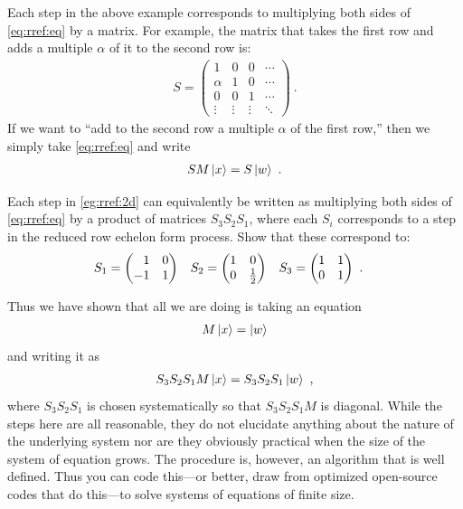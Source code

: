 \documentclass[12pt, oneside]{report}    %
\begin{document}
Each step in the above example corresponds to multiplying both sides of \eqref{eq:rref:eq} by a matrix. For example, the matrix that takes the first row and adds a multiple $\alpha$ of it to the second row is:
\begin{align}
    S = 
    \begin{pmatrix}
        1 & 
        0 & 
        0 & 
        \cdots 
        \\
        \alpha & 
        1 & 
        0  & 
        \cdots 
        \\
        0 & 
        0 & 
        1  & 
        \cdots 
        \\
        \vdots &
        \vdots &
        \vdots &
        \ddots 
    \end{pmatrix} \ .
\end{align}
If we want to ``add to the second row a multiple $\alpha$ of the first row,'' then we simply take \eqref{eq:rref:eq} and write
\begin{align}
    SM\left|x\right\rangle = S\left|w\right\rangle \ .
\end{align}
\begin{exercise}
Each step in \eqref{eg:rref:2d} can equivalently be written as multiplying both sides of \eqref{eq:rref:eq} by a product of matrices $S_3 S_2 S_1$, where each $S_i$ corresponds to a step in the reduced row echelon form process. Show that these correspond to:
\begin{align}
    S_1
    &=
    \begin{pmatrix}
        \pp 1 & 0 \\
        -1 & 1
    \end{pmatrix}
    &
    S_2
    &=
    \begin{pmatrix}
        1 & 0 \\
        0 & \frac{1}{2}
    \end{pmatrix}
    &
    S_3
    &=
    \begin{pmatrix}
        1 & 1 \\
        0 & 1
    \end{pmatrix} \ .
\end{align}
\end{exercise}

Thus we have shown that all we are doing is taking an equation 
\begin{align}
    M\left|x\right\rangle = \left|w\right\rangle
\end{align}
and writing it as
\begin{align}
    S_3 S_2 S_1 M \left|x\right\rangle = S_3 S_2 S_1 \left|w\right\rangle \ ,
\end{align}
where $S_3 S_2 S_1$ is chosen systematically so that $S_3 S_2 S_1 M$ is diagonal. While the steps here are all reasonable, they do not elucidate anything about the nature of the underlying system nor are they obviously practical when the size of the system of equation grows. The procedure is, however, an algorithm that is well defined. Thus you can code this---or better, draw from optimized open-source codes that do this---to solve systems of equations of finite size. 
\end{document}
